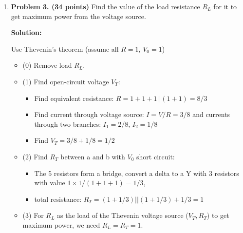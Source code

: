 \begin{enumerate}
{\bf Method 3} Solve the circuit by KVL. Let generator current be $I_0$, current 
through oven be $I_1$, current through battery be $I_2$, set up these equations:
\[	I_0-I_1-I_2=0,\;\;\;\;78-0.2I_0-4I_1=0,\;\;\;\;60+I_2-4I_1=0	\]
Solve to get $I_0=30$, $I_1=18$, $I_2=12$.

{\bf Method 4} Switch the order of $V_0=78V$ and the bottom resistor $0.1\Omega$, 
switch the order of $V_1=60V$ and the resistor of $1\Omega$, ground the bottom line, 
apply KCL to the middle node on top:
\[ \frac{V-78}{0.2}+\frac{V}{4}+\frac{V-60}{1}=0 \]
Solving this we get the voltage across $4\Omega$ to be $V=72V$, and current through 
$4\Omega=72/4=18$.

\item {\bf Problem 3. (34 points)} 
Find the value of the load resistance $R_L$ for it to get maximum power 
from the voltage source.


{\bf Solution:}

 Use Thevenin's theorem (assume all $R=1$, $V_0=1$)
\begin{itemize}
\item (0) Remove load $R_L$.
\item (1) Find open-circuit voltage $V_T$:
\begin{itemize}
\item Find equivalent resistance: $R=1+1+1||(1+1)=8/3$
\item Find current through voltage source: $I=V/R=3/8$
	and currents through two branches: $I_1=2/8$, $I_2=1/8$
\item Find $V_T=3/8+1/8=1/2$
\end{itemize}
\item (2) Find $R_T$ between a and b with $V_0$ short circuit:
\begin{itemize}
\item The 5 resistors form a bridge, convert a delta to a Y with 
 3 resistors with value $1 \times 1/(1+1+1)=1/3$, 
\item total resistance: $R_T=(1+1/3)||(1+1/3)+1/3=1$
\end{itemize}
\item (3) For $R_L$ as the load of the Thevenin voltage source 
	($V_T, R_T$) to get maximum power, we need $R_L=R_T=1$.
\end{itemize}

\end{enumerate}




